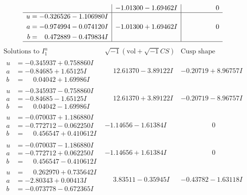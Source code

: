 \documentclass[1p]{elsarticle_modified}
\theoremstyle{definition}
\newcommand{\I}{\sqrt{-1}}
\begin{document}
$$\begin{array}{c|c|c}
 & -1.01300 - 1.69462 I & \phantom{-0.000000 } 0 \\ \hline\begin{aligned}
u &= -0.326526 - 1.106980 I \\
a &= -0.974994 - 0.074120 I \\
b &= \phantom{-}0.472889 - 0.479834 I\end{aligned}
 & -1.01300 + 1.69462 I & \phantom{-0.000000 } 0\\
 \hline 
 \end{array}$$\newpage$$\begin{array}{c|c|c}  
\text{Solutions to }I^u_{1}& \I (\text{vol} + \sqrt{-1}CS) & \text{Cusp shape}\\
 \hline 
\begin{aligned}
u &= -0.345937 + 0.758860 I \\
a &= -0.84685 + 1.65125 I \\
b &= \phantom{-}0.04042 + 1.69986 I\end{aligned}
 & \phantom{-}12.61370 - 3.89122 I & -0.20719 + 8.96757 I \\ \hline\begin{aligned}
u &= -0.345937 - 0.758860 I \\
a &= -0.84685 - 1.65125 I \\
b &= \phantom{-}0.04042 - 1.69986 I\end{aligned}
 & \phantom{-}12.61370 + 3.89122 I & -0.20719 - 8.96757 I \\ \hline\begin{aligned}
u &= -0.070037 + 1.186880 I \\
a &= -0.772712 - 0.062250 I \\
b &= \phantom{-}0.456547 + 0.410612 I\end{aligned}
 & -1.14656 - 1.61384 I & \phantom{-0.000000 } 0 \\ \hline\begin{aligned}
u &= -0.070037 - 1.186880 I \\
a &= -0.772712 + 0.062250 I \\
b &= \phantom{-}0.456547 - 0.410612 I\end{aligned}
 & -1.14656 + 1.61384 I & \phantom{-0.000000 } 0 \\ \hline\begin{aligned}
u &= \phantom{-}0.262970 + 0.735642 I \\
a &= -2.80343 + 0.00413 I \\
b &= -0.073778 - 0.672365 I\end{aligned}
 & \phantom{-}3.83511 - 0.35945 I & -0.43782 - 1.63118 I \\ \hline\begin{aligned}

\end{aligned}
\end{array}$$
\end{document}
